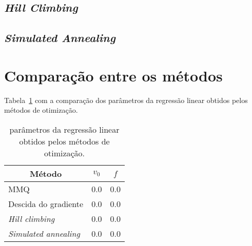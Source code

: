 \documentclass[brazil, 12pt]{article}
\begin{document}
\subsection{\emph{Hill Climbing}}

\subsection{\emph{Simulated Annealing}}



\section{Comparação entre os métodos}

Tabela~\ref{tab:comp} com a comparação dos parâmetros da regressão linear obtidos pelos métodos de otimização.

\begin{table}[H]
\centering
\caption{parâmetros da regressão linear obtidos pelos métodos de otimização.}
\label{tab:comp}
\begin{tabular}{|l|l|l|}
\hline
\multicolumn{1}{|c|}{\textbf{Método}}       & \multicolumn{1}{c|}{\textbf{$v_0$}} & \multicolumn{1}{c|}{\textbf{$f$}} \\ \hline
MMQ                         & 0.0       & 0.0       \\ \hline
Descida do gradiente        & 0.0       & 0.0       \\ \hline
\emph{Hill climbing}        & 0.0       & 0.0       \\ \hline
\emph{Simulated annealing}  & 0.0       & 0.0       \\ \hline
\end{tabular}
\end{table}
\end{document}

